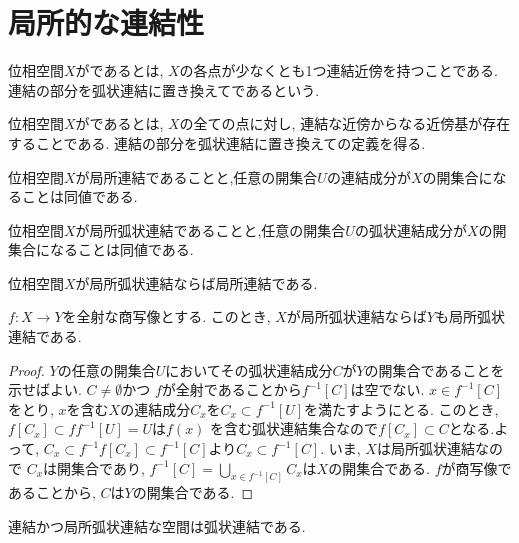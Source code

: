 \documentclass[uplatex, dvipdfmx, a4paper, 12pt, class=jsbook, crop=false]{standalone}
\begin{document}
\section{局所的な連結性}
\label{sec:locally-connectedness-properties}

\begin{definition}
	位相空間$ X $がであるとは, $ X $の各点が少なくとも1つ連結近傍を持つことである. 連結の部分を弧状連結に置き換えてであるという.
\end{definition}

\begin{definition}
	位相空間$ X $がであるとは, $ X $の全ての点に対し, 連結な近傍からなる近傍基が存在することである. 連結の部分を弧状連結に置き換えての定義を得る.
\end{definition}

\begin{proposition}
	\label{prop:LocCtd<>Every component of all open subset U is open in X}
	位相空間$ X $が局所連結であることと,任意の開集合$ U $の連結成分が$ X $の開集合になることは同値である.
\end{proposition}

\begin{proposition}
	\label{prop:LocPathCtd<>Every pathcomponent of all open subset U is open in X}
	位相空間$ X $が局所弧状連結であることと,任意の開集合$ U $の弧状連結成分が$ X $の開集合になることは同値である.
\end{proposition}

\begin{proposition}
	\label{prop:LocPathCtd>LocCtd}
	位相空間$ X $が局所弧状連結ならば局所連結である.
\end{proposition}

\begin{proposition}
	\label{prop:Quotient maps preserve LocPathCtd}
	$f\colon X\to Y$を全射な商写像とする. このとき, $X$が局所弧状連結ならば$Y$も局所弧状連結である.
\end{proposition}

\begin{proof}
	$Y$の任意の開集合$U$においてその弧状連結成分$C$が$Y$の開集合であることを示せばよい.
	$C\neq \emptyset$かつ $f$が全射であることから$ f^{-1}[C]$は空でない. $x\in f^{-1}[C]$をとり, $x$を含む$X$の連結成分$C_x$を$C_x \subset f^{-1}[U]$を満たすようにとる. このとき, $f[C_x] \subset ff^{-1}[U]=U$は$f(x)$
	を含む弧状連結集合なので$f[C_x]\subset C$となる.よって, $C_x\subset f^{-1}f[C_x]\subset f^{-1}[C]$より$C_x\subset f^{-1}[C]$. いま, $X$は局所弧状連結なので
	$C_x$は開集合であり, $f^{-1}[C]=\bigcup_{x\in f^{-1}[C]}C_x$は$X$の開集合である.  $f$が商写像であることから, $C$は$Y$の開集合である.
\end{proof}

\begin{proposition}
	\label{prop:Ctd + LocCtd > PathCtd}
	連結かつ局所弧状連結な空間は弧状連結である.
\end{proposition}
\end{document}
